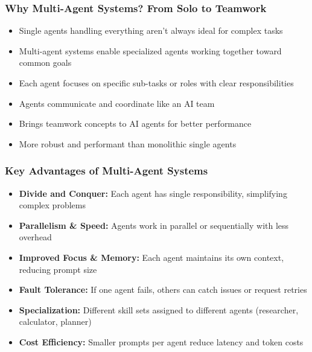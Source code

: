 \begin{frame}[fragile]\frametitle{Why Multi-Agent Systems? From Solo to Teamwork}

      \begin{itemize}
		\item Single agents handling everything aren't always ideal for complex tasks
		\item Multi-agent systems enable specialized agents working together toward common goals
		\item Each agent focuses on specific sub-tasks or roles with clear responsibilities
		\item Agents communicate and coordinate like an AI team
		\item Brings teamwork concepts to AI agents for better performance
		\item More robust and performant than monolithic single agents
	  \end{itemize}

\end{frame}

\begin{frame}[fragile]\frametitle{Key Advantages of Multi-Agent Systems}

      \begin{itemize}
		\item \textbf{Divide and Conquer:} Each agent has single responsibility, simplifying complex problems
		\item \textbf{Parallelism \& Speed:} Agents work in parallel or sequentially with less overhead
		\item \textbf{Improved Focus \& Memory:} Each agent maintains its own context, reducing prompt size
		\item \textbf{Fault Tolerance:} If one agent fails, others can catch issues or request retries
		\item \textbf{Specialization:} Different skill sets assigned to different agents (researcher, calculator, planner)
		\item \textbf{Cost Efficiency:} Smaller prompts per agent reduce latency and token costs
	  \end{itemize}

\end{frame}

